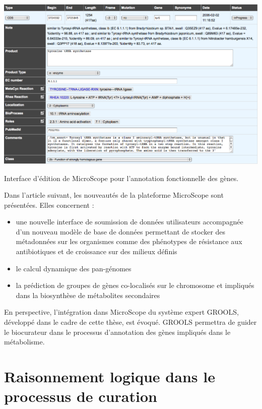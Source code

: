 \begin{refsegment}
    \begin{shadedfigure}[H]
        \centering
        \includegraphics[width=\textwidth]{img/curation_edit.png}
        \caption{Interface d'édition de MicroScope pour l'annotation fonctionnelle des gènes. }
        \label{fig:edit_microscope}
    \end{shadedfigure}

    Dans l'article suivant, les nouveautés de la plateforme MicroScope sont présentées. Elles concernent :
    \begin{itemize}
    	\item une nouvelle interface de soumission de données utilisateurs accompagnée d'un nouveau modèle de base de données permettant de stocker des métadonnées sur les organismes comme des phénotypes de résistance aux antibiotiques et de croissance sur des milieux définis 
    	\item le calcul dynamique des pan-génomes
    	\item la prédiction de groupes de gènes co-localisés sur le chromosome et impliqués dans la biosynthèse de métabolites secondaires
    \end{itemize}
	En perspective, l'intégration dans MicroScope du système expert GROOLS, développé dans le cadre de cette thèse, est évoqué. GROOLS permettra de guider le biocurateur dans le processus d'annotation des gènes impliqués dans le métabolisme. 

    
    

    \section{Raisonnement logique dans le processus de curation}
    

\end{refsegment}
